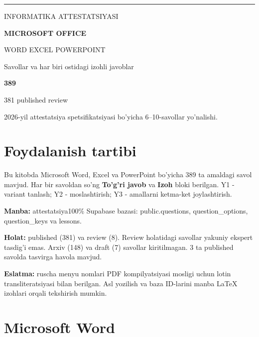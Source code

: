 \documentclass[10pt,a4paper]{article}
\begin{document}
\begin{titlepage}
\vspace*{33mm}
{\color{teal}\rule{\linewidth}{2pt}}\par
\vspace{17mm}
{\Large INFORMATIKA ATTESTATSIYASI }\par
\vspace{13mm}
{\fontsize{31}{38}\selectfont\bfseries\color{ink}MICROSOFT OFFICE}\par
\vspace{5mm}
{\fontsize{21}{26}\selectfont WORD \quad EXCEL \quad POWERPOINT}\par
\vspace{15mm}
{\Large Savollar va har biri ostidagi izohli javoblar}\par
\vspace{20mm}
{\Huge\bfseries\color{teal}389}\par
{\large 381 published  review}\par
\vfill
{\color{muted}2026-yil attestatsiya spetsifikatsiyasi bo'yicha 6--10-savollar yo'nalishi.}
\par\vspace{8mm}{\color{teal}\rule{\linewidth}{2pt}}
\end{titlepage}
\section*{Foydalanish tartibi}
Bu kitobda Microsoft Word, Excel va PowerPoint bo'yicha 389 ta amaldagi savol mavjud.
Har bir savoldan so'ng \textbf{To'g'ri javob} va \textbf{Izoh} bloki berilgan.
Y1 - variant tanlash; Y2 - moslashtirish; Y3 - amallarni ketma-ket joylashtirish.
\par\textbf{Manba:} attestatsiya100\% Supabase bazasi: public.questions, question\_options, question\_keys va lessons. 
\par\textbf{Holat:} published (381) va review (8). Review holatidagi savollar yakuniy ekspert tasdig'i emas.
Arxiv (148) va draft (7) savollar kiritilmagan. 3 ta published savolda tasvirga havola mavjud.
\par\textbf{Eslatma:} ruscha menyu nomlari PDF kompilyatsiyasi mosligi uchun lotin transliteratsiyasi bilan berilgan.
Asl yozilish va baza ID-larini manba LaTeX izohlari orqali tekshirish mumkin.
\tableofcontents\clearpage
\section{Microsoft Word}
\end{document}
